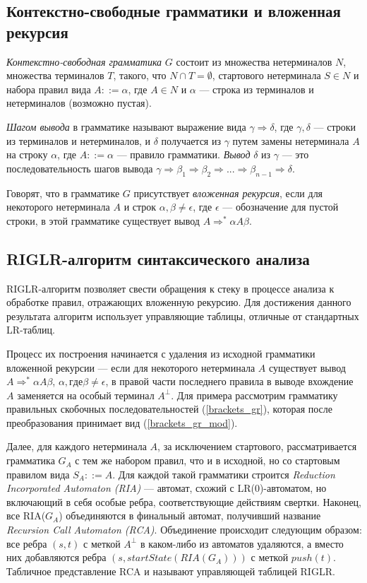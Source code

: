 \documentclass[14pt]{matmex-diploma-custom}
\begin{document}
\subsection{Контекстно-свободные грамматики и вложенная рекурсия}
\textit{Контекстно-свободная грамматика} $G$ состоит из множества нетерминалов $N$, множества терминалов $T$, такого, что $N \cap T = \emptyset$, стартового нетерминала $S \in N$ и набора правил вида $A ::= \alpha$, где $A \in N$ и $\alpha$ --- строка из терминалов и нетерминалов (возможно пустая).

\textit{Шагом вывода} в грамматике называют выражение вида $\gamma \Rightarrow \delta$, где $\gamma, \delta$ --- строки из терминалов и нетерминалов, и $\delta$ получается из $\gamma$ путем замены нетерминала $A$ на строку $\alpha$, где $A ::= \alpha$ --- правило грамматики. \textit {Вывод} $\delta$ из $\gamma$ --- это последовательность шагов вывода $\gamma \Rightarrow \beta_1 \Rightarrow \beta_2 \Rightarrow ... \Rightarrow \beta_{n - 1} \Rightarrow \delta$.

Говорят, что в грамматике $G$ присутствует \textit{вложенная рекурсия}, если для некоторого нетерминала $A$ и строк $\alpha, \beta \neq \epsilon$, где $\epsilon$ --- обозначение для пустой строки, в этой грамматике существует вывод $A \Rightarrow^* \alpha A \beta$.

\subsection{RIGLR-алгоритм синтаксического анализа}

RIGLR-алгоритм позволяет свести обращения к стеку в процессе анализа к обработке правил, отражающих вложенную рекурсию. Для достижения данного результата алгоритм использует управляющие таблицы, отличные от стандартных LR-таблиц.

Процесс их построения начинается с удаления из исходной грамматики вложенной рекурсии --- если для некоторого нетерминала $A$ существует вывод $A \Rightarrow^* \alpha A \beta$, $\alpha, где \beta \neq \epsilon$, в правой части последнего правила в выводе вхождение $A$ заменяется на особый терминал $A^\perp$. Для примера рассмотрим грамматику правильных скобочных последовательностей (\ref{brackets_gr}), которая после преобразования принимает вид (\ref{brackets_gr_mod}).

Далее, для каждого нетерминала $A$, за исключением стартового, рассматривается грамматика $G_A$ с тем же набором правил, что и в исходной, но со стартовым правилом вида $S_A ::= A$. Для каждой такой грамматики строится \textit{Reduction Incorporated Automaton (RIA)} --- автомат, схожий с LR(0)-автоматом, но включающий в себя особые ребра, соответствующие действиям свертки. 
Наконец, все RIA($G_A$) объединяются в финальный автомат, получивший название \textit{Recursion Call Automaton (RCA)}. Объединение происходит следующим образом: все ребра $(s, t)$ с меткой $A^\perp$ в каком-либо из автоматов удаляются, а вместо них добавляются ребра $(s, startState(RIA(G_A)))$ с меткой $push(t)$. Табличное представление RCA и называют управляющей таблицей RIGLR. 
\end{document}
